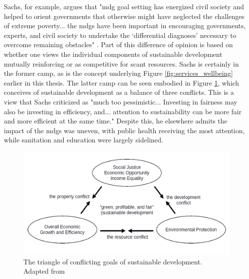 Sachs, for example, argues that "\ac{mdg} goal setting has energized civil society and helped to orient governments that otherwise might have neglected the challenges of extreme poverty... the \acp{mdg} have been important in encouraging governments, experts, and civil society to undertake the `differential diagnoses' necessary to overcome remaining obstacles" \cite{sachsAgeSustainableDevelopment2015}. Part of this difference of opinion is based on whether one views the individual components of sustainable development mutually reinforcing or as competitive for scant resources. Sachs is certainly in the former camp, as is the concept underlying Figure \ref{fig:services_wellbeing} earlier in this thesis. The latter camp can be seen embodied in Figure \ref{fig:sustainable_triangle}, which conceives of sustainable development as a balance of three conflicts. This is a view that Sachs criticized as "much too pessimistic... Investing in fairness may also be investing in efficiency, and... attention to sustainability can be more fair and more efficient at the same time." Despite this, he elsewhere admits the impact of the \acp{mdg} was uneven, with public health receiving the most attention, while sanitation and education were largely sidelined. \cite{sachsAgeSustainableDevelopment2015}


\begin{figure}[h]
	\centering
	\includegraphics[scale=0.35]{Figures/chap2/sustainable_triangle.png}
	\caption[The triangle of conflicting goals of sustainable development]{The triangle of conflicting goals of sustainable development. Adapted from \cite{campbellGreenCitiesGrowing2016}}
	\label{fig:sustainable_triangle}
\end{figure}

